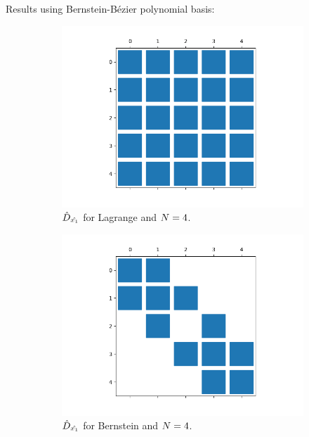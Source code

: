 \begin{frame}{Results using Bernstein-Bézier polynomial basis:}

\begin{figure}[htbp]
\begin{subfigure}{0.45\textwidth}
\centering
\includegraphics[scale=0.2]{image/dx_lag_4.png}
\caption{${{\hat{D}}_{\hat{x_1}}}$ for Lagrange and ${N}=4$.}
\end{subfigure}
\begin{subfigure}{0.45\textwidth}
\centering
\includegraphics[scale=0.2]{image/dx_bb_4.png}
\caption{${{\hat{D}}_{\hat{x_1}}}$ for Bernstein and ${N}=4$.}
\end{subfigure}
\begin{subfigure}{0.45\textwidth}

\end{subfigure}
\end{figure}
\end{frame}
